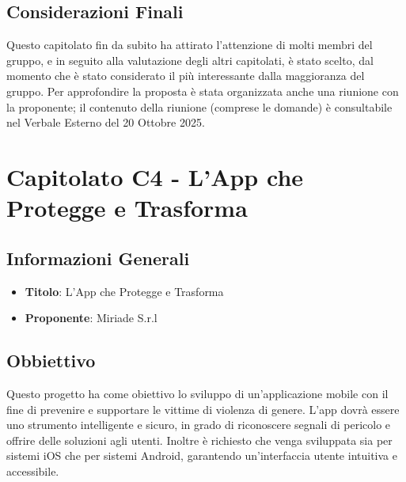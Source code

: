 \documentclass[a4paper,12pt]{article}
\begin{document}
    \subsection{Considerazioni Finali}
    Questo capitolato fin da subito ha attirato l'attenzione di molti membri del gruppo, e in seguito alla valutazione degli altri capitolati, è stato scelto, dal momento che è stato considerato il più interessante dalla maggioranza del gruppo. Per approfondire la proposta è stata organizzata anche una riunione con la proponente; il contenuto della riunione (comprese le domande) è consultabile nel Verbale Esterno del 20 Ottobre 2025.

    \section{Capitolato C4 - L’App che Protegge e Trasforma}
    \subsection{Informazioni Generali}
        \begin{itemize}
            \item \textbf{Titolo}: L’App che Protegge e Trasforma
            \item \textbf{Proponente}: Miriade S.r.l
        \end{itemize}
    \subsection{Obbiettivo}
    Questo progetto ha come obiettivo lo sviluppo di un’applicazione mobile con il fine di prevenire e supportare le vittime di violenza di genere. L’app dovrà essere uno strumento intelligente e sicuro, in grado di riconoscere segnali di pericolo e offrire delle soluzioni agli utenti. Inoltre è richiesto che venga sviluppata sia per sistemi iOS che per sistemi Android, garantendo un’interfaccia utente intuitiva e accessibile.
\end{document}
